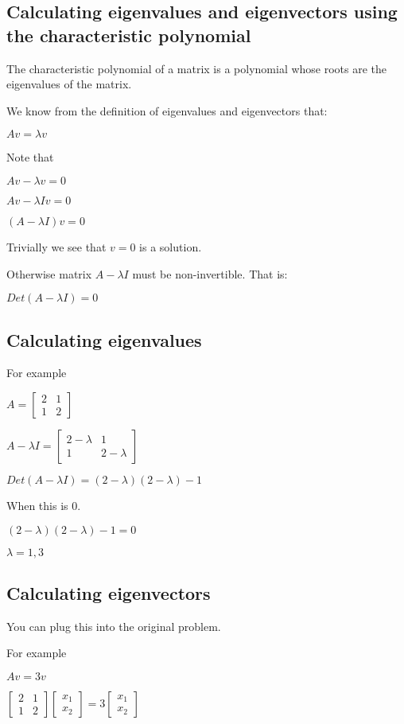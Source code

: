 
\subsection{Calculating eigenvalues and eigenvectors using the characteristic polynomial}

The characteristic polynomial of a matrix is a polynomial whose roots are the eigenvalues of the matrix.

We know from the definition of eigenvalues and eigenvectors that:

\(Av=\lambda v\)

Note that

\(Av-\lambda v=0\)

\(Av-\lambda Iv=0\)

\((A-\lambda I)v=0\)

Trivially we see that \(v=0\) is a solution.

Otherwise matrix \(A-\lambda I\) must be non-invertible. That is:

\(Det(A-\lambda I)=0\)

\subsection{Calculating eigenvalues}

For example

\(A=\begin{bmatrix}2&1\\1 & 2\end{bmatrix}\)

\(A-\lambda I=\begin{bmatrix}2-\lambda &1\\1 & 2-\lambda \end{bmatrix}\)

\(Det(A-\lambda I)=(2-\lambda )(2-\lambda )-1\)

When this is \(0\).

\((2-\lambda )(2-\lambda )-1=0\)

\(\lambda =1,3\)

\subsection{Calculating eigenvectors}

You can plug this into the original problem.

For example

\(Av=3v\)

\(\begin{bmatrix}2&1\\1 & 2\end{bmatrix}\begin{bmatrix}x_1\\x_2\end{bmatrix}=3\begin{bmatrix}x_1\\x_2\end{bmatrix}\)

